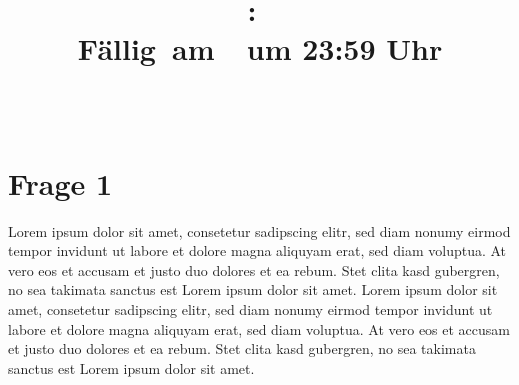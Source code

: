 \documentclass{article}
\title{
    \textmd{\textbf{\hmwkClass:\ \hmwkTitle}}\\
    \normalsize\vspace{0.1in}\small{F\"allig\ am\ \hmwkDueDate\ um 23:59 Uhr}\\
    \vspace{0.1in}\large{\textit{\hmwkClassInstructor\ }}
    \vspace{0.2in}
}
\author{\hmwkAuthorName}
\date{}
\begin{document}
\maketitle

\section{Frage 1}


Lorem ipsum dolor sit amet, consetetur sadipscing elitr, sed diam nonumy eirmod tempor invidunt ut labore et dolore magna aliquyam erat, sed diam voluptua. At vero eos et accusam et justo duo dolores et ea rebum. Stet clita kasd gubergren, no sea takimata sanctus est Lorem ipsum dolor sit amet. Lorem ipsum dolor sit amet, consetetur sadipscing elitr, sed diam nonumy eirmod tempor invidunt ut labore et dolore magna aliquyam erat, sed diam voluptua. At vero eos et accusam et justo duo dolores et ea rebum. Stet clita kasd gubergren, no sea takimata sanctus est Lorem ipsum dolor sit amet.
\end{document}
